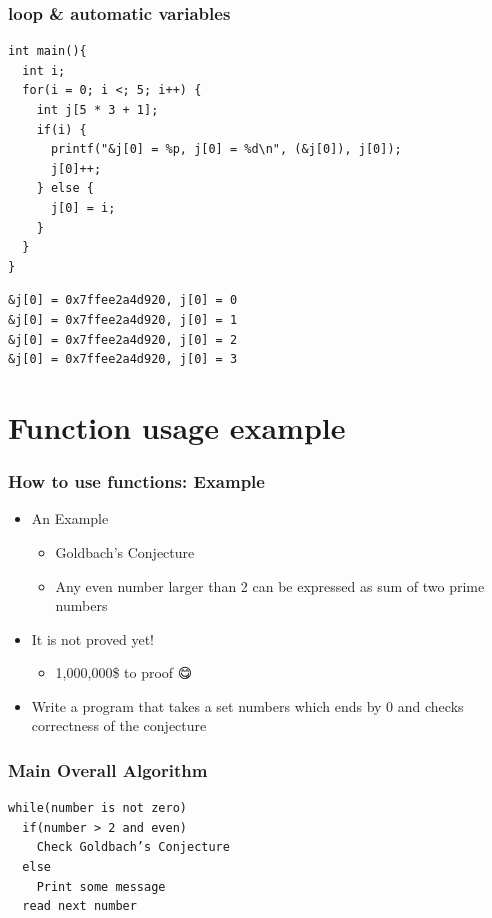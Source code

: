 \documentclass{../c-lecture}
\begin{document}
\begin{frame}[fragile]
  \frametitle{loop \& automatic variables}
  \begin{verbatim}
int main(){
  int i;
  for(i = 0; i <; 5; i++) {
    int j[5 * 3 + 1];
    if(i) {
      printf("&j[0] = %p, j[0] = %d\n", (&j[0]), j[0]);
      j[0]++;
    } else {
      j[0] = i;
    }
  }
}
  \end{verbatim}
\end{frame}

\begin{frame}[fragile]
  \begin{verbatim}
&j[0] = 0x7ffee2a4d920, j[0] = 0
&j[0] = 0x7ffee2a4d920, j[0] = 1
&j[0] = 0x7ffee2a4d920, j[0] = 2
&j[0] = 0x7ffee2a4d920, j[0] = 3
  \end{verbatim}
\end{frame}

\section{Function usage example}

\begin{frame}
  \frametitle{How to use functions: Example}
  \begin{itemize}
    \item An Example
    \begin{itemize}
      \item Goldbach’s Conjecture
      \item
        Any even number larger than 2 can be expressed as sum of two prime
        numbers

    \end{itemize}
    \item It is not proved yet!
    \begin{itemize}
      \item 1,000,000\$ to proof 😋
    \end{itemize}
    \item
      Write a program that takes a set numbers which ends by 0 and checks
      correctness of the conjecture
  \end{itemize}
\end{frame}

\begin{frame}
  \frametitle{Main Overall Algorithm}
  \begin{verbatim}
while(number is not zero)
  if(number > 2 and even)
    Check Goldbach’s Conjecture
  else
    Print some message
  read next number
  \end{verbatim}
\end{frame}
\end{document}
